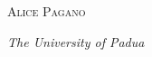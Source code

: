 \begin{titlepage}
	{\scshape\Large Alice Pagano \\} %
	
	\vspace{0.5\baselineskip} %
	
	\textit{The University of Padua } %
	
	\vfill %
	
%	
%	
%	
%	

\end{titlepage}

\clearpage{\pagestyle{empty}\cleardoublepage}
